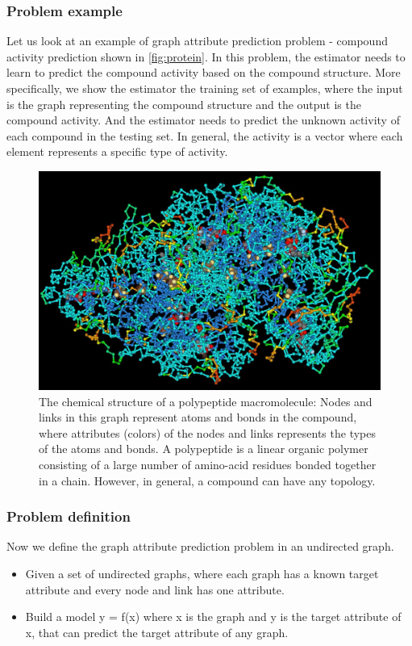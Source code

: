 \documentclass{article}
\begin{document}
\subsubsection{Problem example}
Let us look at an example of graph attribute prediction problem - compound activity prediction shown in \autoref{fig:protein}.
In this problem, the estimator needs to learn to predict the compound activity
based on the compound structure.
More specifically, we show the estimator the training set of examples,
where the input is the graph representing the compound structure and
the output is the compound activity.
And the estimator needs to predict the unknown activity of each compound
in the testing set.
In general, the activity is a vector
where each element represents a specific type of activity.
\begin{figure}[!htb]\centering
	\includegraphics[width=\textwidth]{ProteinStructure}
	\caption{
		The chemical structure of a polypeptide macromolecule:
		Nodes and links in this graph represent atoms and bonds in the compound,
		where attributes (colors) of the nodes and links represents
		the types of the atoms and bonds.
		A polypeptide is a linear organic polymer consisting of a large number of amino-acid residues bonded together in a chain.
		However, in general, a compound can have any topology.
	}
	\label{fig:protein}
\end{figure}

\subsubsection{Problem definition}
Now we define the graph attribute prediction problem in an undirected graph.
\begin{itemize}
	\item Given a set of undirected graphs, where each graph has a known target attribute and every node and link has one attribute.
	\item Build a model y = f(x) where x is the graph and y is the target attribute of x, that can predict the target attribute of any graph.
\end{itemize}
\end{document}

